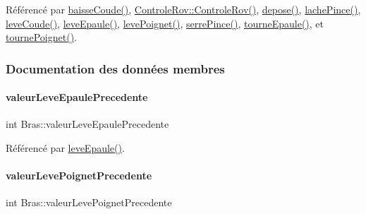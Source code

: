 Référencé par \hyperlink{class_bras_a4b8e4791a454fcf884b1e7217a16a326}{baisse\+Coude()}, \hyperlink{class_controle_rov_acc4d5fea26770217df978d43df2ad51e}{Controle\+Rov\+::\+Controle\+Rov()}, \hyperlink{class_bras_a69d95616a74732e13b23bd90680d7d21}{depose()}, \hyperlink{class_bras_a246e835f25bd61f0618c58aafea99ea1}{lache\+Pince()}, \hyperlink{class_bras_a197686a4ff55b4fe2384b2af44b8228b}{leve\+Coude()}, \hyperlink{class_bras_ac8f658db87d03bfbba6faa535326cc3a}{leve\+Epaule()}, \hyperlink{class_bras_ac95f54d8b02e7c88081f482fbbc40aef}{leve\+Poignet()}, \hyperlink{class_bras_a55e143cf8e696ed214809ae25fb558d5}{serre\+Pince()}, \hyperlink{class_bras_aaeacb18f22532a63559fc8430118169e}{tourne\+Epaule()}, et \hyperlink{class_bras_a15beae8aa104c2e689614486646ab402}{tourne\+Poignet()}.



\subsubsection{Documentation des données membres}
\mbox{\label{class_bras_ab9045906376dd797febdcb5956b155c1}} 
\paragraph{\texorpdfstring{valeur\+Leve\+Epaule\+Precedente}{valeurLeveEpaulePrecedente}}
{\footnotesize\ttfamily int Bras\+::valeur\+Leve\+Epaule\+Precedente\hspace{0.3cm}{\ttfamily [private]}}



Référencé par \hyperlink{class_bras_ac8f658db87d03bfbba6faa535326cc3a}{leve\+Epaule()}.

\mbox{\label{class_bras_a83bd1b995ba642e336c24151ba4964cf}} 
\paragraph{\texorpdfstring{valeur\+Leve\+Poignet\+Precedente}{valeurLevePoignetPrecedente}}
{\footnotesize\ttfamily int Bras\+::valeur\+Leve\+Poignet\+Precedente\hspace{0.3cm}{\ttfamily [private]}}



